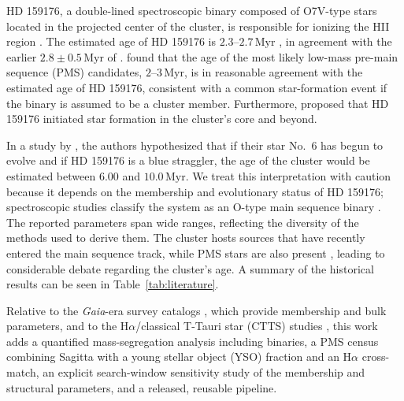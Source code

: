 \documentclass{aa}
\begin{document}
HD 159176, a double-lined spectroscopic binary composed of O7V-type stars located in the projected center of the cluster, is responsible for ionizing the HII region \citep{2016ApJ...832..211P}. The estimated age of HD 159176 is $2.3$--$2.7\,\mathrm{Myr}$ \citep{2010AA...511A..25R}, in agreement with the earlier $2.8\pm0.5\,\mathrm{Myr}$ of \citet{1978MNRAS.182..607F}\@. \citet{2010AA...511A..25R} found that the age of the most likely low-mass pre-main sequence (PMS) candidates, $2$--$3\,\mathrm{Myr}$, is in reasonable agreement with the estimated age of HD 159176, consistent with a common star-formation event if the binary is assumed to be a cluster member. Furthermore, \citet{1978MNRAS.182..607F} proposed that HD 159176 initiated star formation in the cluster's core and beyond.

In a study by \citet{2018AA...610A..30A}, the authors hypothesized that if their star No.~6 has begun to evolve and if HD 159176 is a blue straggler, the age of the cluster would be estimated between $6.00$ and $10.0\,\mathrm{Myr}$. We treat this interpretation with caution because it depends on the membership and evolutionary status of HD 159176; spectroscopic studies classify the system as an O-type main sequence binary \citep{1993Obs...113..204S,2007A&A...474..193L,2016ApJ...832..211P}. The reported parameters span wide ranges, reflecting the diversity of the methods used to derive them. The cluster hosts sources that have recently entered the main sequence track, while PMS stars are also present \citep{2019MNRAS.484.5102K}, leading to considerable debate regarding the cluster's age. A summary of the historical results can be seen in Table~\ref{tab:literature}.

Relative to the \textit{Gaia}-era survey catalogs \citep{2020AA...640A...1C,2022ApJS..262....7H,2024arXiv240305143H}, which provide membership and bulk parameters, and to the H$\alpha$/classical T-Tauri star (CTTS) studies \citep{2010AA...511A..25R,2019MNRAS.484.5102K}, this work adds a quantified mass-segregation analysis including binaries, a PMS census combining Sagitta with a young stellar object (YSO) fraction and an H$\alpha$ cross-match, an explicit search-window sensitivity study of the membership and structural parameters, and a released, reusable pipeline.
\end{document}

